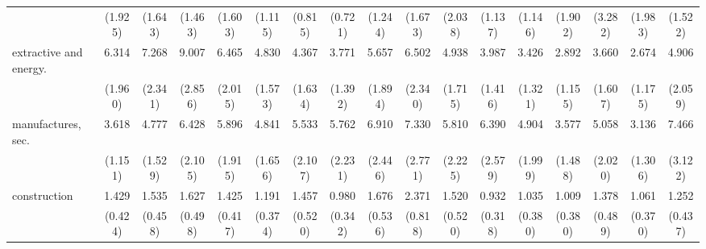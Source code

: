 {\begin{tabular}{l*{16}{c}}
                    &     (1.925)         &     (1.643)         &     (1.463)         &     (1.603)         &     (1.115)         &     (0.815)         &     (0.721)         &     (1.244)         &     (1.673)         &     (2.038)         &     (1.137)         &     (1.146)         &     (1.902)         &     (3.282)         &     (1.983)         &     (1.522)         \\
[1em]
extractive and energy.&       6.314\sym{***}&       7.268\sym{***}&       9.007\sym{***}&       6.465\sym{***}&       4.830\sym{***}&       4.367\sym{***}&       3.771\sym{***}&       5.657\sym{***}&       6.502\sym{***}&       4.938\sym{***}&       3.987\sym{***}&       3.426\sym{**} &       2.892\sym{**} &       3.660\sym{**} &       2.674\sym{*}  &       4.906\sym{***}\\
                    &     (1.960)         &     (2.341)         &     (2.856)         &     (2.015)         &     (1.573)         &     (1.634)         &     (1.392)         &     (1.894)         &     (2.340)         &     (1.715)         &     (1.416)         &     (1.321)         &     (1.155)         &     (1.607)         &     (1.175)         &     (2.059)         \\
[1em]
manufactures, sec.  &       3.618\sym{***}&       4.777\sym{***}&       6.428\sym{***}&       5.896\sym{***}&       4.841\sym{***}&       5.533\sym{***}&       5.762\sym{***}&       6.910\sym{***}&       7.330\sym{***}&       5.810\sym{***}&       6.390\sym{***}&       4.904\sym{***}&       3.577\sym{**} &       5.058\sym{***}&       3.136\sym{**} &       7.466\sym{***}\\
                    &     (1.151)         &     (1.529)         &     (2.105)         &     (1.915)         &     (1.656)         &     (2.107)         &     (2.231)         &     (2.446)         &     (2.771)         &     (2.225)         &     (2.579)         &     (1.999)         &     (1.488)         &     (2.020)         &     (1.306)         &     (3.122)         \\
[1em]
construction        &       1.429         &       1.535         &       1.627         &       1.425         &       1.191         &       1.457         &       0.980         &       1.676         &       2.371\sym{*}  &       1.520         &       0.932         &       1.035         &       1.009         &       1.378         &       1.061         &       1.252         \\
                    &     (0.424)         &     (0.458)         &     (0.498)         &     (0.417)         &     (0.374)         &     (0.520)         &     (0.342)         &     (0.536)         &     (0.818)         &     (0.520)         &     (0.318)         &     (0.380)         &     (0.380)         &     (0.489)         &     (0.370)         &     (0.437)         \\

\end{tabular}}
